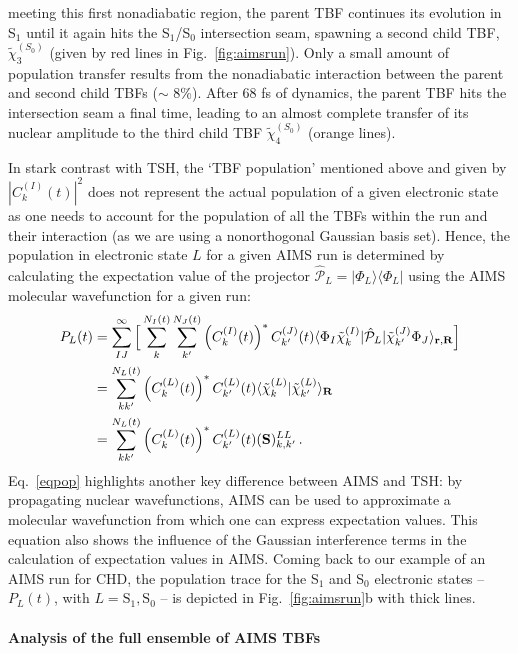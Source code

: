 \documentclass[9pt,bestpractices,pubversion]{livecoms}
\newcommand{\bs}{\mathbf}
\begin{document}
meeting this first nonadiabatic region, the parent TBF continues its evolution in S$_1$ until it again hits the S$_1$/S$_0$ intersection seam, spawning a second child TBF, $\tilde{\chi}_{3}^{(S_0)}$ (given by red lines in Fig.~\ref{fig:aimsrun}). Only a small amount of population transfer results from the nonadiabatic interaction between the parent and second child TBFs ($\sim$ 8\%). After 68 fs of dynamics, the parent TBF hits the intersection seam a final time, leading to an almost complete transfer of its nuclear amplitude to the third child TBF $\tilde{\chi}_{4}^{(S_0)}$ (orange lines).

In stark contrast with TSH, the `TBF population' mentioned above and given by $|C_{k}^{(I)}(t)|^2$ does not represent the actual population of a given electronic state as one needs to account for the population of all the TBFs within the run and their interaction (as we are using a nonorthogonal Gaussian basis set). Hence, the population in electronic state $L$ for a given AIMS run is determined by calculating the expectation value of the projector $\hat{\mathcal{P}}_L = | \Phi_L \rangle\langle \Phi_L |$ using the AIMS molecular wavefunction for a given run:
\begin{align}
P_L(t) &  = \sum_{IJ}^\infty \Big[ \sum_k^{N_I(t)}\sum_{k'}^{N_J(t)}
\left(C_{k}^{(I)}(t)\right)^\ast C_{k'}^{(J)}(t)  \langle   \Phi_I \tilde{\chi}_{k}^{(I)} |  \hat{\mathcal{P}}_L  | \tilde{\chi}_{k'}^{(J)} \Phi_J \rangle_{\bs r, \bs R}
\Big] \notag \\
& =  \sum_{kk'}^{N_L(t)}\left(C_{k}^{(L)}(t)\right)^\ast C_{k'}^{(L)}(t)  \langle \tilde{\chi}_{k}^{(L)}  | \tilde{\chi}_{k'}^{(L)}  \rangle_{\bs R}  \notag \\
&=   \sum_{kk'}^{N_L(t)} \left(C_{k}^{(L)}(t)\right)^\ast C_{k'}^{(L)}(t)  (\bs S)^{LL}_{k,k'} \, .
\label{eqpop}
\end{align}
Eq.~\eqref{eqpop} highlights another key difference between AIMS and TSH: by propagating nuclear wavefunctions, AIMS can be used to approximate a molecular wavefunction from which one can express expectation values. This equation also shows the influence of the Gaussian interference terms in the calculation of expectation values in AIMS. Coming back to our example of an AIMS run for CHD, the population trace for the S$_1$ and S$_0$ electronic states -- $P_{L}(t)$, with $L=\text{S}_1,\text{S}_0$ -- is depicted in Fig.~\ref{fig:aimsrun}b with thick lines. 

\paragraph{Analysis of the full ensemble of AIMS TBFs}
\end{document}
